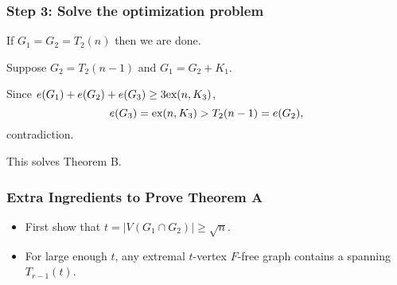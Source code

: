 \documentclass{beamer}
\newcommand*{\ex}{\textnormal{ex}}
\begin{document}
\begin{frame}
  \frametitle{Step 3: Solve the optimization problem}

  If $G_1 = G_2 = T_{2}(n)$ then we are done.

  \pause

  \vspace{0.5cm}

  Suppose $G_2 = T_{2}(n - 1)$ and $G_1 = G_2 + K_1$. 

  \pause

  \vspace{0.5cm}

  Since $e(G_1) + e(G_2) + e(G_3) \geq 3\ex(n, K_3)$,
  \[
    e(G_3) = \ex(n, K_3) > T_{2}(n - 1) = e(G_2),
  \]
  contradiction.

  \pause

  \vspace{0.5cm}

  This solves Theorem B.
\end{frame}

\begin{frame}
  \frametitle{Extra Ingredients to Prove Theorem A}

  \begin{itemize}
    \item First show that $t = |V(G_1 \cap G_2)| \geq \sqrt{n}$.
    \item For large enough $t$, any extremal $t$-vertex $F$-free graph contains a spanning $T_{r - 1}(t)$.
  \end{itemize}
\end{frame}
\end{document}
